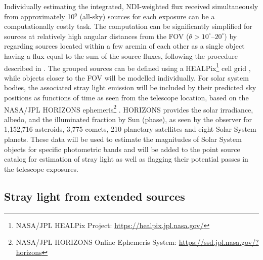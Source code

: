 \documentclass[usenames,dvipsnames,modern]{CLASS_FILES/aastex631}  %
\begin{document}
Individually estimating the integrated, NDI-weighted flux received simultaneously from approximately 10$^9$ (all-sky) sources for each exposure can be a computationally costly task. The computation can be significantly simplified for sources at relatively high angular distances from the FOV ($\theta>10^{\circ}$--$20^{\circ}$) by regarding sources located within a few arcmin of each other as a single object having a flux equal to the sum of the source fluxes, following the procedure described in \citet{borlaff+2021arxiv2108.10321}. The grouped sources can be defined using a HEALPix\footnote{NASA/JPL HEALPix Project: \url{https://healpix.jpl.nasa.gov/}} cell grid \citep{gorski+2005apj622_759}, while objects closer to the FOV will be modelled individually. For solar system bodies, the associated stray light emission  will be included by their predicted sky positions as functions of time as seen from the telescope location, based on the NASA/JPL HORIZONS ephemeris\footnote{NASA/JPL HORIZONS Online Ephemeris System: \url{https://ssd.jpl.nasa.gov/?horizons}} \citep{giorgini+2001inproceedings_1562}. HORIZONS provides the solar irradiance, albedo, and the illuminated fraction by Sun (phase), as seen by the observer for 1,152,716 asteroids, 3,775 comets, 210 planetary satellites and eight Solar System planets. These data will be used to estimate the magnitudes of Solar System objects for specific photometric bands and will be added to the point source catalog for estimation of stray light as well as flagging their potential passes in the telescope exposures.



\subsection{Stray light from extended sources}
\label{Subsec:methods_earth}
\end{document}
